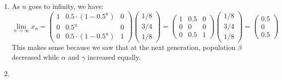 \documentclass[11pt, legalpaper]{article}
\begin{document}
\begin{enumerate}
    \item As $n$ goes to infinity, we have:
    $$\lim_{n\to \infty}x_n=\begin{pmatrix}
        1 & 0.5\cdot(1-0.5^n) & 0 \\
        0 & 0.5^n & 0 \\
        0 & 0.5\cdot(1-0.5^n) & 1
    \end{pmatrix}\begin{pmatrix} 1/8 \\ 3/4 \\ 1/8 \end{pmatrix}=\begin{pmatrix} 1 & 0.5 & 0 \\
        0 & 0& 0 \\
        0 & 0.5 & 1\end{pmatrix}\begin{pmatrix} 1/8 \\ 3/4 \\ 1/8 \end{pmatrix}=\begin{pmatrix} 0.5 \\ 0 \\ 0.5 \end{pmatrix}$$
    This makes sense because we saw that at the next generation, population $\beta$ decreased while $\alpha$ and $\gamma$ increased equally.
    
    \item 
\end{enumerate}
\end{document}

